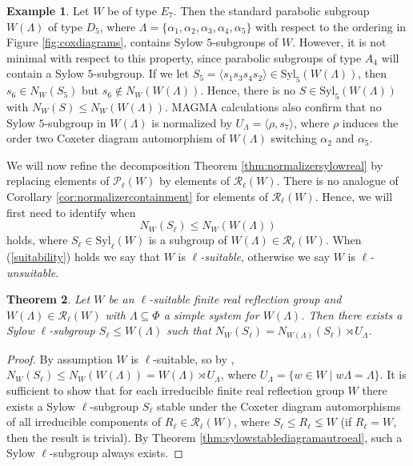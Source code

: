 \documentclass[12pt]{amsart}
\theoremstyle{plain}
\newtheorem{theorem}{Theorem}[section]
\theoremstyle{definition}
\numberwithin{equation}{section}
\newtheorem{example}[theorem]{Example}
\numberwithin{equation}{section}
\begin{document}
	\begin{example}
		Let $W$ be of type $E_7$. Then the standard parabolic subgroup $W(\Lambda)$ of type $D_5$, where $\Lambda=\{\alpha_1,\alpha_2,\alpha_3,\alpha_4,\alpha_5\}$ with respect to the ordering in Figure \ref{fig:coxdiagrams}, contains Sylow $5$-subgroups of $W$. However, it is not minimal with respect to this property, since parabolic subgroups of type $A_4$ will contain a Sylow $5$-subgroup. If we let $S_5=\langle s_1s_3s_4s_2\rangle\in \text{Syl}_5(W(\Lambda))$, then $s_6\in N_W(S_5)$ but $s_6\notin N_W(W(\Lambda))$. Hence, there is no $S\in \text{Syl}_5(W(\Lambda))$ with $N_W(S)\leq N_W(W(\Lambda))$. MAGMA calculations also confirm that no Sylow $5$-subgroup in $W(\Lambda)$ is normalized by $U_\Lambda=\langle \rho, s_7\rangle$, where $\rho$ induces the order two Coxeter diagram automorphism of $W(\Lambda)$ switching $\alpha_2$ and $\alpha_5$.
	\end{example}
	
	We will now refine the decomposition Theorem \ref{thm:normalizersylowreal} by replacing elements of $\mathcal{P}_\ell(W)$ by elements of $\mathcal{R}_\ell(W)$. There is no analogue of Corollary \ref{cor:normalizercontainment} for elements of $\mathcal{R}_\ell(W)$. Hence, we will first need to identify when
	\begin{equation}\label{suitability}
		N_W(S_\ell)\leq N_W(W(\Lambda))
	\end{equation}
	holds, where $S_\ell\in\text{Syl}_\ell(W)$ is a subgroup of $W(\Lambda)\in \mathcal{R}_\ell(W)$. When (\ref{suitability}) holds we say that $W$ is \emph{$\ell$-suitable}, otherwise we say $W$ is \emph{$\ell$-unsuitable}.
	
	\begin{theorem}\label{thm:normalizersylowref}
		Let $W$ be an $\ell$-suitable finite real reflection group and $W(\Lambda)\in\mathcal{R}_\ell(W)$ with $\Lambda\subseteq\Phi$ a simple system for $W(\Lambda)$. Then there exists a Sylow $\ell$-subgroup $S_\ell\leq W(\Lambda)$ such that $N_W(S_\ell)=N_{W(\Lambda)}(S_\ell)\rtimes U_\Lambda$.
	\end{theorem}
	
	\begin{proof}
		By assumption $W$ is $\ell$-suitable, so by \cite{HOWLETT}, $N_W(S_\ell)\leq N_W(W(\Lambda))=W(\Lambda)\rtimes U_\Lambda$, where $U_\Lambda=\{w\in W \mid w\Lambda=\Lambda\}$. It is sufficient to show that for each irreducible finite real reflection group $W$ there exists a Sylow $\ell$-subgroup $S_\ell$ stable under the Coxeter diagram automorphisms of all irreducible components of $R_\ell\in \mathcal{R}_\ell(W)$, where $S_\ell\leq R_\ell\lneq W$ (if $R_\ell=W$, then the result is trivial). By Theorem \ref{thm:sylowstablediagramautroeal}, such a Sylow $\ell$-subgroup always exists.
	\end{proof}
	
\end{document}
